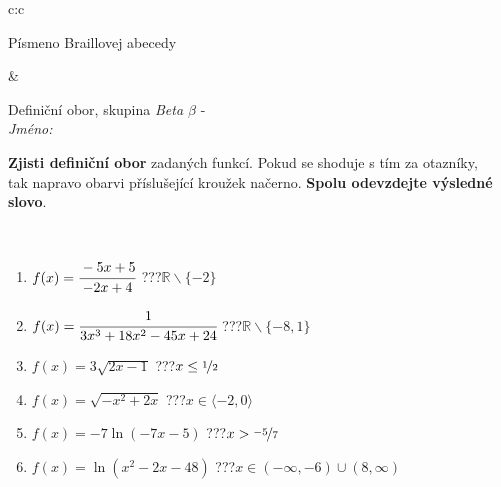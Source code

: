 \documentclass[10pt]{report}
\begin{document}
\begin{tabular}{c:c}
\begin{minipage}[c][104.5mm][t]{0.5\linewidth}
\begin{center}
\begin{minipage}{0.20\linewidth}
\begin{center}
{\small Písmeno Braillovej abecedy}
\end{center}
\end{minipage}
\end{center}
\end{minipage}
&
\begin{minipage}[c][104.5mm][t]{0.5\linewidth}
\begin{center}
\vspace{7mm}
{\huge Definiční obor, skupina \textit{Beta $\beta$} -}\\[5mm]
\textit{Jméno:}\phantom{xxxxxxxxxxxxxxxxxxxxxxxxxxxxxxxxxxxxxxxxxxxxxxxxxxxxxxxxxxxxxxxxx}\\[5mm]
\begin{minipage}{0.95\linewidth}
\begin{center}
\textbf{Zjisti definiční obor} zadaných funkcí. Pokud se shoduje s tím za otazníky,\\tak napravo obarvi příslušející kroužek načerno. \textbf{Spolu odevzdejte výsledné slovo}.
\end{center}
\end{minipage}
\\[1mm]
\begin{minipage}{0.79\linewidth}
\begin{center}
\begin{varwidth}{\linewidth}
\begin{enumerate}
\normalsizerrr
\item $f(x)=\cfrac{-5x+5}{-2x+4}$\quad \dotfill\; ???\;\dotfill \quad $\mathbb{R}\smallsetminus\{-2\}$
\item $f(x)=\cfrac{1}{3x^3+18x^2-45x+24}$\quad \dotfill\; ???\;\dotfill \quad $\mathbb{R}\smallsetminus\{-8,1\}$
\item $f(x)=3\sqrt{2x-1}$\quad \dotfill\; ???\;\dotfill \quad $x\leq\nicefrac{1}{2}$
\item $f(x)=\sqrt{-x^2+2x}$\quad \dotfill\; ???\;\dotfill \quad $x\in\langle-2 , 0\rangle$
\item $f(x)=-7\ln{(-7x-5)}$\quad \dotfill\; ???\;\dotfill \quad $x>\nicefrac{-5}{7}$
\item $f(x)=\ln{(x^2-2x-48)}$\quad \dotfill\; ???\;\dotfill \quad $x\in(-\infty , -6)\cup(8 , \infty)$
\end{enumerate}
\end{varwidth}
\end{center}
\end{minipage}
\begin{minipage}{0.20\linewidth}
\begin{center}

\end{center}
\end{minipage}
\end{center}
\end{minipage}
\end{tabular}
\end{document}
